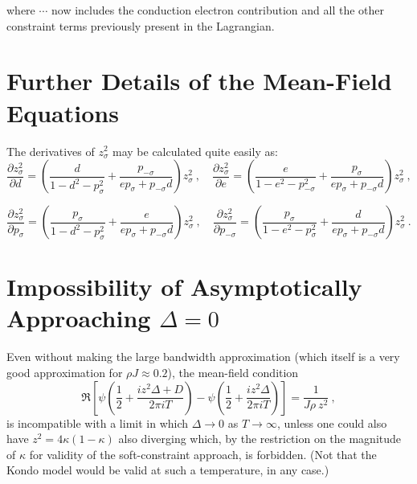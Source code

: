 where $ \cdots $ now includes the conduction electron contribution and all the other constraint terms previously present in the Lagrangian.



\section{Further Details of the Mean-Field Equations}
\label{sec:MF_eq_details}

The derivatives of $ z^2_{\sigma} $ may be calculated quite easily as:
\begin{equation}
\frac{\partial z^2_{\sigma}}{\partial d} = \left( \frac{d}{1 - d^2 - p^2_{\sigma}} + \frac{p_{-\sigma}}{e p_{\sigma} + p_{- \sigma} d} \right) z^2_{\sigma} ~, \quad \frac{\partial z^2_{\sigma}}{\partial e} = \left( \frac{e}{1 - e^2 - p^2_{-\sigma}} + \frac{p_{\sigma}}{e p_{\sigma} + p_{- \sigma} d} \right) z^2_{\sigma} ~,
\end{equation}

\begin{equation}
\frac{\partial z^2_{\sigma}}{\partial p_{\sigma}} = \left( \frac{p_{\sigma}}{1 - d^2 - p^2_{\sigma}} + \frac{e}{e p_{\sigma} + p_{- \sigma} d} \right) z^2_{\sigma} ~, \quad \frac{\partial z^2_{\sigma}}{\partial p_{-\sigma}} = \left( \frac{p_{\sigma}}{1 - e^2 - p^2_{\sigma}} + \frac{d}{e p_{\sigma} + p_{- \sigma} d} \right) z^2_{\sigma} ~.
\end{equation}

\section{Impossibility of Asymptotically Approaching $ \Delta = 0 $}

Even without making the large bandwidth approximation (which itself is a very good approximation for $ \rho J \approx 0.2 $), the mean-field condition
\begin{equation}
\Re{\left[ \psi \left( \frac{1}{2} + \frac{i z^2 \Delta + D}{2 \pi i T} \right) - \psi \left( \frac{1}{2} + \frac{i z^2 \Delta}{2 \pi i T} \right) \right] = \frac{1}{J \rho ~ z^2}} ~ ,
\end{equation}
is incompatible with a limit in which $ \Delta \rightarrow 0 $ as $ T \rightarrow \infty $, unless one could also have $ z^2 = 4 \kappa (1 - \kappa) $ also diverging which, by the restriction on the magnitude of $ \kappa $ for validity of the soft-constraint approach, is forbidden. (Not that the Kondo model would be valid at such a temperature, in any case.)

